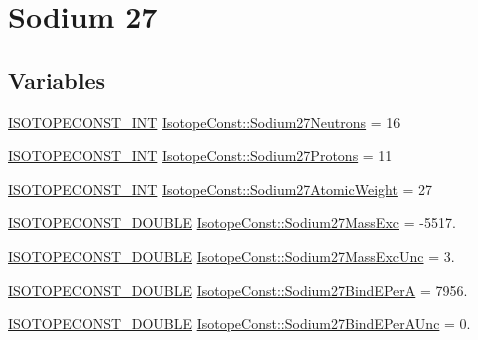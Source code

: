 \hypertarget{group___isotope_const-_sodium-_na27}{}\section{Sodium 27}
\label{group___isotope_const-_sodium-_na27}
\subsection*{Variables}
\begin{DoxyCompactItemize}
\item 
\mbox{\hyperlink{group___isotope_const-_macros_ga5f18360b3e99483a35c32d789e62621c}{I\+S\+O\+T\+O\+P\+E\+C\+O\+N\+S\+T\+\_\+\+I\+NT}} \mbox{\hyperlink{group___isotope_const-_sodium-_na27_ga9d80aa2d62c59ccd7d5d3584db1d9fa7}{Isotope\+Const\+::\+Sodium27\+Neutrons}} = 16
\item 
\mbox{\hyperlink{group___isotope_const-_macros_ga5f18360b3e99483a35c32d789e62621c}{I\+S\+O\+T\+O\+P\+E\+C\+O\+N\+S\+T\+\_\+\+I\+NT}} \mbox{\hyperlink{group___isotope_const-_sodium-_na27_gaee5186ad06cb32cf632a21e8db9a385e}{Isotope\+Const\+::\+Sodium27\+Protons}} = 11
\item 
\mbox{\hyperlink{group___isotope_const-_macros_ga5f18360b3e99483a35c32d789e62621c}{I\+S\+O\+T\+O\+P\+E\+C\+O\+N\+S\+T\+\_\+\+I\+NT}} \mbox{\hyperlink{group___isotope_const-_sodium-_na27_gad967dbea8eb79487be1c4f3cca234b0d}{Isotope\+Const\+::\+Sodium27\+Atomic\+Weight}} = 27
\item 
\mbox{\hyperlink{group___isotope_const-_macros_ga8f45a7272ce02c0b4c65c44636ed719a}{I\+S\+O\+T\+O\+P\+E\+C\+O\+N\+S\+T\+\_\+\+D\+O\+U\+B\+LE}} \mbox{\hyperlink{group___isotope_const-_sodium-_na27_ga98ee16cf460b37dc1f0cff7bd0409fcc}{Isotope\+Const\+::\+Sodium27\+Mass\+Exc}} = -\/5517.
\item 
\mbox{\hyperlink{group___isotope_const-_macros_ga8f45a7272ce02c0b4c65c44636ed719a}{I\+S\+O\+T\+O\+P\+E\+C\+O\+N\+S\+T\+\_\+\+D\+O\+U\+B\+LE}} \mbox{\hyperlink{group___isotope_const-_sodium-_na27_ga5ce5f7235e1c844a384bce37085e4eda}{Isotope\+Const\+::\+Sodium27\+Mass\+Exc\+Unc}} = 3.
\item 
\mbox{\hyperlink{group___isotope_const-_macros_ga8f45a7272ce02c0b4c65c44636ed719a}{I\+S\+O\+T\+O\+P\+E\+C\+O\+N\+S\+T\+\_\+\+D\+O\+U\+B\+LE}} \mbox{\hyperlink{group___isotope_const-_sodium-_na27_gabb1f59480978a67e65061717e4170440}{Isotope\+Const\+::\+Sodium27\+Bind\+E\+PerA}} = 7956.
\item 
\mbox{\hyperlink{group___isotope_const-_macros_ga8f45a7272ce02c0b4c65c44636ed719a}{I\+S\+O\+T\+O\+P\+E\+C\+O\+N\+S\+T\+\_\+\+D\+O\+U\+B\+LE}} \mbox{\hyperlink{group___isotope_const-_sodium-_na27_ga16a112cc66458cd7e42f13b24504d642}{Isotope\+Const\+::\+Sodium27\+Bind\+E\+Per\+A\+Unc}} = 0.

\end{DoxyCompactItemize}
